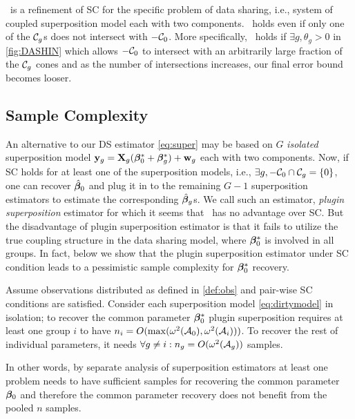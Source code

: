 

\begin{remark}
	\ds\ is a refinement of SC for the specific problem of data sharing, i.e., system of coupled superposition model each with two components. \ds\ holds even if only one of the $\cC_g$s does not intersect with $-\cC_0$. More specifically, \ds\ holds if $\exists g, \theta_g > 0$ in \cref{fig:DASHIN} which allows $-\cC_0$ to intersect with an arbitrarily large fraction of the $\cC_g$ cones and as the number of intersections increases, our final error bound becomes looser.
\end{remark}

\subsection{Sample Complexity}
An alternative to our DS estimator \cref{eq:super} may be based on $G$ \emph{isolated} superposition model $\mathbf{y}_g = \mathbf{X}_g (\boldsymbol{\beta} _0^* + \boldsymbol{\beta} _g^*) + \mathbf{w}_g$ each with two components. Now, if SC holds for at least one of the superposition models, i.e., $\exists g, -\cC_0 \cap \cC_g = \{0 \}$, one can recover $\hat{\boldsymbol{\beta}}_0$ and plug it in to the remaining $G-1$ superposition estimators to estimate the corresponding $\hat{\boldsymbol{\beta}}_g$s. We call such an estimator, \emph{plugin superposition} estimator for which it seems that \ds\ has no advantage over SC. But the disadvantage of plugin superposition estimator is that it fails to utilize the true coupling structure in the data sharing model, where $\boldsymbol{\beta}^*_0$ is involved in all groups. In fact, below we show that the plugin superposition estimator under SC condition leads to a pessimistic sample complexity for $\boldsymbol{\beta}^*_0$ recovery.
\begin{prop}
	\label{prop:super}
	Assume observations distributed as defined in \cref{def:obs} and pair-wise SC conditions are satisfied.  Consider each superposition model \cref{eq:dirtymodel} in isolation; to recover the common parameter $\boldsymbol{\beta} _0^*$ plugin superposition requires at least one group $i$ to have $n_i = O(\max(\omega^2(\cA_0), \omega^2(\cA_i)))$. 
	To recover the rest of individual parameters, it needs $\forall g \neq i: n_g = O(\omega^2(\cA_g))$ samples. 
\end{prop}
In other words, by separate analysis of superposition estimators at least one problem needs to have sufficient samples for recovering the common parameter $\boldsymbol{\beta}_0$ and therefore the common parameter recovery does not benefit from the pooled $n$ samples.
